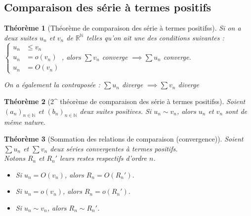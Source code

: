 \documentclass[11pt,a4paper]{report}
\newtheorem{theorem}{Théorème}[chapter]
\newtheorem{itheorem}[theorem]{Théorème}
\theoremstyle{definition}
\begin{document}
\subsection{Comparaison des série à termes positifs} %
\label{sub:comparaison_des_satp}
\begin{theorem}[Théorème de comparaison des série à termes positifss]
    Si on a deux suites $u_n$ et $v_n$ de $\ensuremath{\mathbb{R}}^\mathbb{N}$ telles qu'on ait une des conditions suivantes : $
    \left\lbrace
    \begin{aligned}
        u_n &\le v_n    \\
        u_n &= o(v_n)   \\
        u_n &= O(v_n)
    \end{aligned}
    \right. $, alors $\sum v_n$ converge $\implies \sum u_n$ converge. \par

    On a également la contraposée : 
    $\sum u_n$ diverge $\implies \sum v_n$ diverge
\end{theorem}
\begin{theorem}[2^{} théorème de comparaison des série à termes positifss]
     Soient $(a_n)_{n\in \mathbb{N}}$ et $(b_n)_{n\in \mathbb{N}}$ \emph{deux suites positives}. \newline
     Si $u_n \sim v_n$, alors $u_n$ et $v_n$ sont de même nature.
\end{theorem}
\begin{itheorem}[Sommation des relations de comparaison (convergence)]
     Soient $\sum u_n$ et $\sum v_n$ deux séries \emph{convergentes} à termes positifs.\\
     Notons $R_n$ et $R_n'$ leurs restes respectifs d'ordre $n$.
     \begin{itemize}
         \item Si $u_n = O(v_n)$, alors $R_n = O(R_n')$. 
         \item Si $u_n = o(v_n)$, alors $R_n = o(R_n')$. 
         \item Si $u_n \sim v_n$, alors $R_n \sim R_n'$. 
     \end{itemize}
\end{itheorem}
\end{document}
